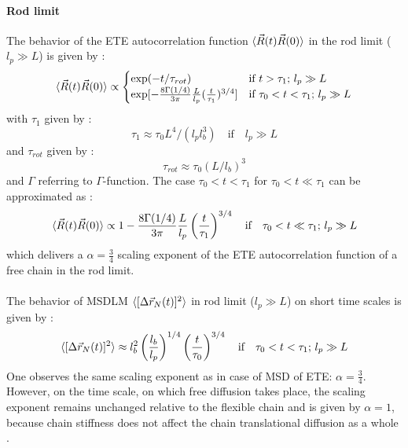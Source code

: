 \documentclass[
    paper=A4,pagesize=automedia,fontsize=12pt,
    BCOR=15mm,DIV=22,
    twoside,headinclude,footinclude=false,
    fleqn,             %
    bibliography=totocnumbered,          %
    listof=totoc,                %
    listof=flat,                 %
    cleardoublepage=empty      %
    numbers=endperiod
]{scrartcl}
\begin{document}
\paragraph{Rod limit}
The behavior of the ETE autocorrelation function $\langle\vec{R}(t)\vec{R}(0)\rangle$
in the rod limit ($l_p \gg L$) is given by \cite{Nikoubashman2016}:
\begin{equation} \label{eq:autocorr_ete_rod_limit}
    \langle\vec{R}(t)\vec{R}(0)\rangle \propto \begin{cases}
    \exp(-t/\tau_{rot}) & \text{if } t > \tau_1 \text{; } l_p \gg L \\
    \exp[-\frac{8 \Gamma(1/4)}{3 \pi}\frac{L}{l_p}(\frac{t}{\tau_1})^{3/4}] & \text{if } \tau_0 < t < \tau_1 \text{; } l_p \gg L
    \end{cases}
\end{equation}
with $\tau_1$ given by \cite{Nikoubashman2016}:
\begin{equation} \label{eq:tau_1_rod_limit}
    \tau_1 \approx \tau_0 L^4 / (l_p l_b^3) \quad \text{if} \quad l_p \gg L
\end{equation}
and $\tau_{rot}$ given by \cite{Nikoubashman2016}: 
\begin{equation} \label{eq:tau_rot_rod_limit}
    \tau_{rot} \approx \tau_0 (L/l_b)^3
\end{equation}
and $\Gamma$ referring to $\Gamma$-function.
The case $\tau_0 < t < \tau_1$ for $\tau_0 < t \ll \tau_1$ can be approximated as \cite{Nikoubashman2016}:
\begin{equation}
    \langle\vec{R}(t)\vec{R}(0)\rangle \propto 1-\frac{8 \Gamma(1/4)}{3 \pi}\frac{L}{l_p}\left(\frac{t}{\tau_1}\right)^{3/4} \quad \text{if} \quad \tau_0 < t \ll \tau_1 \text{; } l_p \gg L 
\end{equation}
which delivers a $\alpha = \frac{3}{4}$ scaling exponent of the ETE autocorrelation function of
a free chain in the rod limit.
\\
\\
The behavior of MSDLM $\langle[\Delta \vec{r}_N(t)]^2\rangle$
in rod limit ($l_p \gg L$) on short time scales 
is given by \cite{Nikoubashman2016}:
\begin{equation}
    \langle[\Delta \vec{r}_N(t)]^2\rangle \approx l_b^2\left(\frac{l_b}{l_p}\right)^{1/4}\left(\frac{t}{\tau_0}\right)^{3/4} \quad \text{if} \quad \tau_0 < t < \tau_1 \text{; } l_p \gg L
\end{equation}
One observes the same scaling exponent as in case of MSD of ETE: $\alpha=\frac{3}{4}$.
However, on the time scale, on which free diffusion takes place, the scaling
exponent remains unchanged relative to the flexible chain and is given by 
$\alpha=1$, because chain stiffness does not affect the chain translational 
diffusion as a whole \cite{Nikoubashman2016}.
\end{document}
